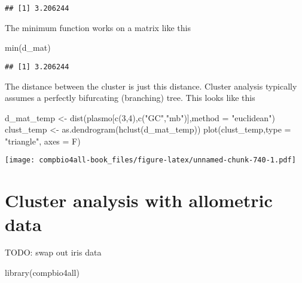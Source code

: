 \documentclass[
]{book}
\newenvironment{Shaded}{\begin{snugshade}}{\end{snugshade}}
\newcommand{\AttributeTok}[1]{\textcolor[rgb]{0.77,0.63,0.00}{#1}}
\newcommand{\DecValTok}[1]{\textcolor[rgb]{0.00,0.00,0.81}{#1}}
\newcommand{\FunctionTok}[1]{\textcolor[rgb]{0.00,0.00,0.00}{#1}}
\newcommand{\NormalTok}[1]{#1}
\newcommand{\OtherTok}[1]{\textcolor[rgb]{0.56,0.35,0.01}{#1}}
\newcommand{\StringTok}[1]{\textcolor[rgb]{0.31,0.60,0.02}{#1}}
\begin{document}
\begin{verbatim}
## [1] 3.206244
\end{verbatim}

The minimum function works on a matrix like this

\begin{Shaded}
\begin{Highlighting}[]
\FunctionTok{min}\NormalTok{(d\_mat)}
\end{Highlighting}
\end{Shaded}

\begin{verbatim}
## [1] 3.206244
\end{verbatim}

The distance between the cluster is just this distance. Cluster analysis typically assumes a perfectly bifurcating (branching) tree. This looks like this

\begin{Shaded}
\begin{Highlighting}[]
\NormalTok{d\_mat\_temp }\OtherTok{\textless{}{-}} \FunctionTok{dist}\NormalTok{(plasmo[}\FunctionTok{c}\NormalTok{(}\DecValTok{3}\NormalTok{,}\DecValTok{4}\NormalTok{),}\FunctionTok{c}\NormalTok{(}\StringTok{"GC"}\NormalTok{,}\StringTok{"mb"}\NormalTok{)],}\AttributeTok{method =} \StringTok{"euclidean"}\NormalTok{)}
\NormalTok{clust\_temp }\OtherTok{\textless{}{-}} \FunctionTok{as.dendrogram}\NormalTok{(}\FunctionTok{hclust}\NormalTok{(d\_mat\_temp))}
\FunctionTok{plot}\NormalTok{(clust\_temp,}\AttributeTok{type =} \StringTok{"triangle"}\NormalTok{, }\AttributeTok{axes =}\NormalTok{ F)}
\end{Highlighting}
\end{Shaded}

\texttt{[image: compbio4all-book\_files/figure-latex/unnamed-chunk-740-1.pdf]}

\hypertarget{cluster-analysis-with-allometric-data}{%
\chapter{Cluster analysis with allometric data}\label{cluster-analysis-with-allometric-data}}

TODO: swap out iris data

\begin{Shaded}
\begin{Highlighting}[]
\FunctionTok{library}\NormalTok{(compbio4all)}
\end{Highlighting}
\end{Shaded}
\end{document}
